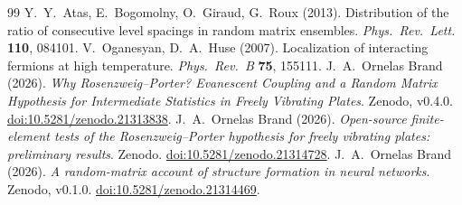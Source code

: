 \documentclass[11pt]{article}
\begin{document}
\begin{thebibliography}{99}
 Y.~Y.~Atas, E.~Bogomolny, O.~Giraud, G.~Roux (2013). Distribution of the ratio
of consecutive level spacings in random matrix ensembles. \emph{Phys.\ Rev.\ Lett.} \textbf{110},
084101.
 V.~Oganesyan, D.~A.~Huse (2007). Localization of interacting fermions at
high temperature. \emph{Phys.\ Rev.\ B} \textbf{75}, 155111.
 J.~A.~Ornelas Brand (2026). \emph{Why Rosenzweig--Porter? Evanescent
Coupling and a Random Matrix Hypothesis for Intermediate Statistics in Freely Vibrating Plates}.
Zenodo, v0.4.0. \href{https://doi.org/10.5281/zenodo.21313838}{doi:10.5281/zenodo.21313838}.
 J.~A.~Ornelas Brand (2026). \emph{Open-source finite-element tests of the
Rosenzweig--Porter hypothesis for freely vibrating plates: preliminary results}. Zenodo.
\href{https://doi.org/10.5281/zenodo.21314728}{doi:10.5281/zenodo.21314728}.
 J.~A.~Ornelas Brand (2026). \emph{A random-matrix account of structure
formation in neural networks}. Zenodo, v0.1.0.
\href{https://doi.org/10.5281/zenodo.21314469}{doi:10.5281/zenodo.21314469}.
\end{thebibliography}
\end{document}
